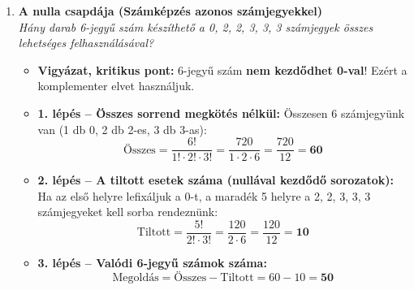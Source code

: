 \documentclass[11pt, a4paper]{article}
\begin{document}
\begin{enumerate}[label=\arabic*., leftmargin=*]
\begin{center}
    \end{center}

    \vspace{0.5cm}

    \item \textbf{A nulla csapdája (Számképzés azonos számjegyekkel)}\\
    \textit{Hány darab 6-jegyű szám készíthető a 0, 2, 2, 3, 3, 3 számjegyek összes lehetséges felhasználásával?}
    \begin{itemize}
        \item \textbf{Vigyázat, kritikus pont:} 6-jegyű szám \textbf{nem kezdődhet 0-val}! Ezért a komplementer elvet használjuk.
        \item \textbf{1. lépés – Összes sorrend megkötés nélkül:}
        Összesen 6 számjegyünk van (1 db 0, 2 db 2-es, 3 db 3-as):
        \[
        \text{Összes} = \frac{6!}{1! \cdot 2! \cdot 3!} = \frac{720}{1 \cdot 2 \cdot 6} = \frac{720}{12} = \mathbf{60}
        \]
        \item \textbf{2. lépés – A tiltott esetek száma (nullával kezdődő sorozatok):}
        Ha az első helyre lefixáljuk a 0-t, a maradék 5 helyre a 2, 2, 3, 3, 3 számjegyeket kell sorba rendeznünk:
        \[
        \text{Tiltott} = \frac{5!}{2! \cdot 3!} = \frac{120}{2 \cdot 6} = \frac{120}{12} = \mathbf{10}
        \]
        \item \textbf{3. lépés – Valódi 6-jegyű számok száma:}
        \[
        \text{Megoldás} = \text{Összes} - \text{Tiltott} = 60 - 10 = \mathbf{50}
        \]
    \end{itemize}


\end{enumerate}
\end{document}
